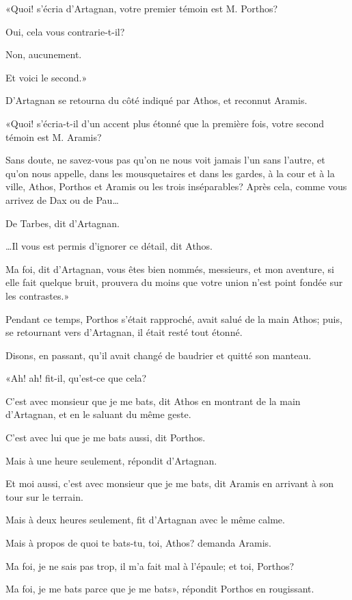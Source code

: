 «Quoi! s'écria d'Artagnan, votre premier témoin est M. Porthos? 

\speak  Oui, cela vous contrarie-t-il? 

\speak  Non, aucunement. 

\speak  Et voici le second.» 

D'Artagnan se retourna du côté indiqué par Athos, et reconnut Aramis. 

«Quoi! s'écria-t-il d'un accent plus étonné que la première fois, votre second témoin est M. Aramis? 

\speak  Sans doute, ne savez-vous pas qu'on ne nous voit jamais l'un sans l'autre, et qu'on nous appelle, dans les mousquetaires et dans les gardes, à la cour et à la ville, Athos, Porthos et Aramis ou les trois inséparables? Après cela, comme vous arrivez de Dax ou de Pau\dots 

\speak  De Tarbes, dit d'Artagnan. 

\speak \dots Il vous est permis d'ignorer ce détail, dit Athos. 

\speak  Ma foi, dit d'Artagnan, vous êtes bien nommés, messieurs, et mon aventure, si elle fait quelque bruit, prouvera du moins que votre union n'est point fondée sur les contrastes.» 

Pendant ce temps, Porthos s'était rapproché, avait salué de la main Athos; puis, se retournant vers d'Artagnan, il était resté tout étonné. 

Disons, en passant, qu'il avait changé de baudrier et quitté son manteau. 

«Ah! ah! fit-il, qu'est-ce que cela? 

\speak  C'est avec monsieur que je me bats, dit Athos en montrant de la main d'Artagnan, et en le saluant du même geste. 

\speak  C'est avec lui que je me bats aussi, dit Porthos. 

\speak  Mais à une heure seulement, répondit d'Artagnan. 

\speak  Et moi aussi, c'est avec monsieur que je me bats, dit Aramis en arrivant à son tour sur le terrain. 

\speak  Mais à deux heures seulement, fit d'Artagnan avec le même calme. 

\speak  Mais à propos de quoi te bats-tu, toi, Athos? demanda Aramis. 

\speak  Ma foi, je ne sais pas trop, il m'a fait mal à l'épaule; et toi, Porthos? 

\speak  Ma foi, je me bats parce que je me bats», répondit Porthos en rougissant. 

